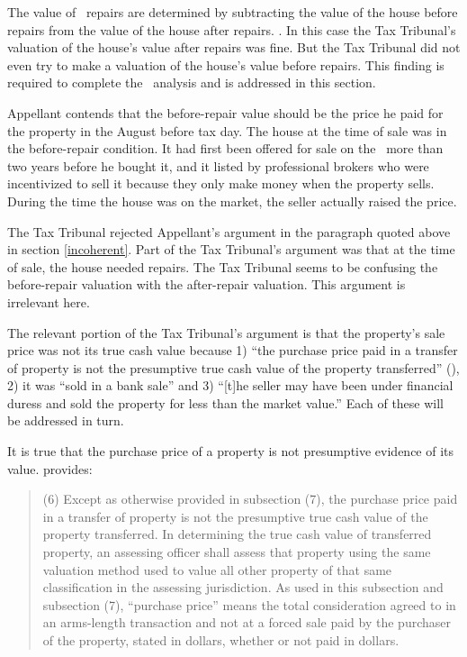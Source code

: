 \documentclass[12pt,\documentclassflag]{michiganCourtOfAppealsBrief}
\def\mathieuGast{\pincite[l]{MCL}{211.27(2)}}
\begin{document}
{The value of \mathieuGast\ repairs are determined by subtracting the value of the house before repairs from the value of the house after repairs. . In this case the Tax Tribunal's valuation of the house's value after repairs was fine. But the Tax Tribunal did not even try to make a valuation of the house's value before repairs. This finding is required to complete the \mathieuGast\ analysis and is addressed in this section.

Appellant contends that the before-repair value should be the price he paid for the property in the August before tax day. The house at the time of sale was in the before-repair condition. It had first been offered for sale on the \MLS\ more than two years before he bought it, and it listed by professional brokers who were incentivized to sell it because they only make money when the property sells. During the time the house was on the market, the seller actually raised the price.

The Tax Tribunal rejected Appellant's argument in the paragraph quoted above in section \ref{incoherent}. Part of the Tax Tribunal's argument was that at the time of sale, the house needed repairs. The Tax Tribunal seems to be confusing the before-repair valuation with the after-repair valuation. This argument is irrelevant here.

The relevant portion of the Tax Tribunal's argument is that the property's sale price was not its true cash value because 1) ``the purchase price paid in a transfer of property is not the presumptive true cash value of the property transferred'' (), 2)  it was ``sold in a bank sale'' and 3) ``[t]he seller may have been under financial duress and sold the property for less than the market value.'' Each of these will be addressed in turn.

It is true that the purchase price of a property is not presumptive evidence of its value.  provides: 

\begin{quote} (6) Except as otherwise provided in subsection (7), the purchase price paid in a transfer of property is not the presumptive true cash value of the property transferred. In determining the true cash value of transferred property, an assessing officer shall assess that property using the same valuation method used to value all other property of that same classification in the assessing jurisdiction. As used in this subsection and subsection (7), ``purchase price'' means the total consideration agreed to in an arms-length transaction and not at a forced sale paid by the purchaser of the property, stated in dollars, whether or not paid in dollars.
\end{quote}

}
\end{document}
